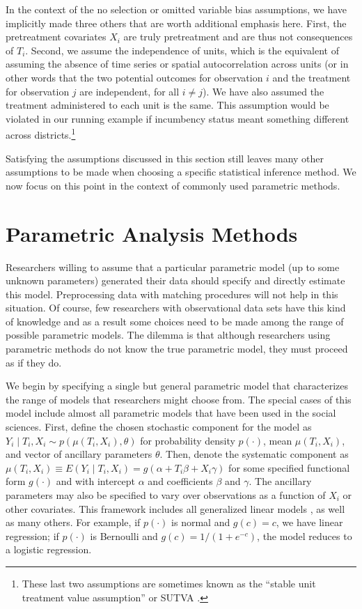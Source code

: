 \documentclass[11pt,titlepage]{article}
\begin{document}
In the context of the no selection or omitted variable bias
assumptions, we have implicitly made three others that are worth
additional emphasis here.  First, the pretreatment covariates $X_i$
are truly pretreatment and are thus not consequences of $T_i$.
Second, we assume the independence of units, which is the equivalent
of assuming the absence of time series or spatial autocorrelation
across units (or in other words that the two potential outcomes for
observation $i$ and the treatment for observation $j$ are independent,
for all $i\not=j$).  We have also assumed the treatment administered
to each unit is the same.  This assumption would be violated in our
running example if incumbency status meant something different across
districts.\footnote{These last two assumptions are sometimes known as
  the ``stable unit treatment value assumption'' or SUTVA
  \citep{Rubin74}.}

Satisfying the assumptions discussed in this section still leaves many
other assumptions to be made when choosing a specific statistical
inference method.  We now focus on this point in the context of
commonly used parametric methods.

\section{Parametric Analysis Methods}

Researchers willing to assume that a particular parametric model (up
to some unknown parameters) generated their data should specify and
directly estimate this model.  Preprocessing data with matching
procedures will not help in this situation.  Of course, few
researchers with observational data sets have this kind of knowledge
and as a result some choices need to be made among the range of
possible parametric models.  The dilemma is that although researchers
using parametric methods do not know the true parametric model, they
must proceed as if they do.

We begin by specifying a single but general parametric model that
characterizes the range of models that researchers might choose from.
The special cases of this model include almost all parametric models
that have been used in the social sciences.  First, define the chosen
stochastic component for the model as $Y_i\mid T_i, X_i \sim
p(\mu(T_i,X_i),\theta)$ for probability density $p(\cdot)$, mean
$\mu(T_i,X_i)$, and vector of ancillary parameters $\theta$.  Then,
denote the systematic component as $\mu(T_i,X_i)\equiv E(Y_i\mid
T_i,X_i)=g(\alpha + T_i\beta + X_i\gamma)$ for some specified
functional form $g(\cdot)$ and with intercept $\alpha$ and
coefficients $\beta$ and $\gamma$.  The ancillary parameters may also
be specified to vary over observations as a function of $X_i$ or other
covariates.  This framework includes all generalized linear models
\citep{McCNel89}, as well as many others.  For example, if $p(\cdot)$
is normal and $g(c)=c$, we have linear regression; if $p(\cdot)$ is
Bernoulli and $g(c)=1/(1+e^{-c})$, the model reduces to a logistic
regression.
\end{document}
